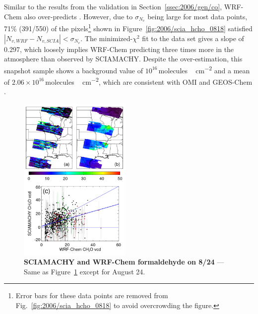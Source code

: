 Similar to the results from the  validation in Section~\ref{ssec:2006/gen/co}, WRF-Chem also over-predicts . However, due to $\sigma_{N_v}$ being large
for most data points, 71\% (391/550) of the pixels\footnote{Error bars for these data points are removed from Fig.~\ref{fig:2006/scia_hcho_0818} to avoid overcrowding the figure.}
shown in Figure~\ref{fig:2006/scia_hcho_0818} satisfied $|N_{v,WRF}-N_{v,SCIA}|<\sigma_{N_v}$. The minimized-$\chi^2$ fit to the data set gives a slope of 0.297, which loosely
implies WRF-Chem predicting three times more  in the atmosphere than observed by SCIAMACHY. Despite the over-estimation, this snapshot sample shows
a background value of $10^{16}$\,\unit{molecules\,cm^{-2}} and a mean of $2.06\times10^{16}$\,\unit{molecules\,cm^{-2}}, which are consistent with OMI and GEOS-Chem
\citep{Millet:2008oq}.

	\begin{figure}
		\centering
		\vspace{-.4in}
		\begin{singlespacing}
		\includegraphics[width=0.48\textwidth]{scia_ch2o_compare_0824}
		\caption[SCIAMACHY and WRF-Chem formaldehyde on 8/24]{{\small\textbf{SCIAMACHY and WRF-Chem formaldehyde on 8/24} --- Same as
		Figure~\ref{fig:2006/scia_hcho_0824} except for August 24.}}
		\label{fig:2006/scia_hcho_0824}
		\end{singlespacing}
		\vspace{-.3in}
	\end{figure}

